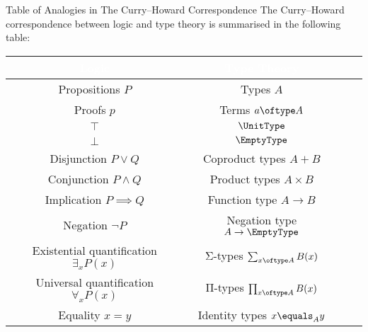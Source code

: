 \begin{remark}{Table of Analogies in The Curry--Howard Correspondence}{}%
    The Curry--Howard correspondence between logic and type theory is summarised in the following table:
    \begingroup%
    \renewcommand{\arraystretch}{1.2}
    \begin{center}
        \begin{tabular}{|Sc|Sc|}\hline{}
            \textcolor{white}{\textbf{Logic}}            & \textcolor{white}{\textbf{Type Theory}} \\\hline{}
            Propositions $P$                             & Types $A$                               \\
            Proofs       $p$                             & Terms $a\oftype A$                      \\
            $\top$                                       & $\UnitType$                             \\
            $\bot$                                       & $\EmptyType$                            \\
            Disjunction $P\lor Q$                        & Coproduct types $A+B$                   \\
            Conjunction $P\land Q$                       & Product types $A\times B$               \\
            Implication $P\implies Q$                    & Function type $A\to B$                  \\
            Negation $\neg P$                            & Negation type $A\to\EmptyType$          \\
            Existential quantification $\exists_{x}P(x)$ & Σ-types $\sum_{x\oftype A}B(x)$         \\
            Universal quantification $\forall_{x}P(x)$   & Π-types $\prod_{x\oftype A}B(x)$        \\
            Equality $x=y$                               & Identity types $x\equals_{A}y$          \\\hline
        \end{tabular}
    \end{center}
    \endgroup
\end{remark}
